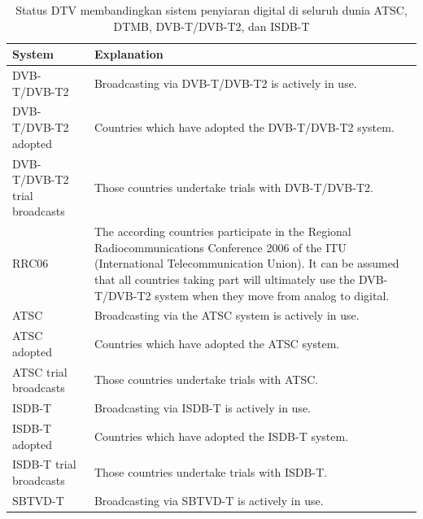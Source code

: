 \begin{singlespace}
	\begin{table}[H]
		\centering
		\caption{Status DTV membandingkan sistem penyiaran digital di seluruh dunia ATSC, DTMB, DVB-T/DVB-T2, dan ISDB-T \citep{dtvstatus2017}}
		\label{Status DTV membandingkan sistem penyiaran digital di seluruh dunia ATSC, DTMB, DVB-T/DVB-T2, dan ISDB-T}
		\begin{tabular}{|p{3cm}|p{10cm}|}
			\hline
			\rowcolor[HTML]{E7E7E7} 
			\textbf{System} & \textbf{Explanation} \\ \hline
			\rowcolor[HTML]{062A5E} 
			{\color[HTML]{FFFFFF} DVB-T/DVB-T2} & {\color[HTML]{FFFFFF} Broadcasting via DVB-T/DVB-T2 is actively in use.} \\ \hline
			\rowcolor[HTML]{0067B1} 
			{\color[HTML]{DDDDDD} DVB-T/DVB-T2 adopted} & {\color[HTML]{DDDDDD} Countries which have adopted the DVB-T/DVB-T2 system.} \\ \hline
			\rowcolor[HTML]{79BDE8} 
			DVB-T/DVB-T2 trial broadcasts & Those countries undertake trials with DVB-T/DVB-T2. \\ \hline
			\rowcolor[HTML]{C1E3EF} 
			RRC06 & The according countries participate in the Regional Radiocommunications Conference 2006 of the ITU (International Telecommunication Union). It can be assumed that all countries taking part will ultimately use the DVB-T/DVB-T2 system when they move from analog to digital. \\ \hline
			\rowcolor[HTML]{0A6927} 
			{\color[HTML]{FFFFFF} ATSC} & {\color[HTML]{FFFFFF} Broadcasting via the ATSC system is actively in use.} \\ \hline
			\rowcolor[HTML]{62B56C} 
			ATSC adopted & Countries which have adopted the ATSC system. \\ \hline
			\rowcolor[HTML]{BBE5B7} 
			ATSC trial broadcasts & Those countries undertake trials with ATSC. \\ \hline
			\rowcolor[HTML]{BE4674} 
			{\color[HTML]{FFFFFF} ISDB-T} & {\color[HTML]{FFFFFF} Broadcasting via ISDB-T is actively in use.} \\ \hline
			\rowcolor[HTML]{F497C3} 
			ISDB-T adopted & Countries which have adopted the ISDB-T system. \\ \hline
			\rowcolor[HTML]{F4BCD6} 
			ISDB-T trial broadcasts & Those countries undertake trials with ISDB-T. \\ \hline
			\rowcolor[HTML]{F184F8} 
			{\color[HTML]{FFFFFF} SBTVD-T} & {\color[HTML]{FFFFFF} Broadcasting via SBTVD-T is actively in use.} \\ \hline

\end{tabular}
\end{table}
\end{singlespace}
